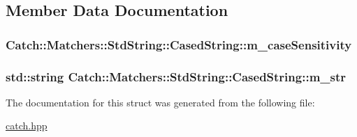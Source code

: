 \subsection{Member Data Documentation}
\hypertarget{struct_catch_1_1_matchers_1_1_std_string_1_1_cased_string_ae1c2864c986941536a6e94cca0528f92}{
\subsubsection[{m\-\_\-case\-Sensitivity}]{ Catch\-::\-Matchers\-::\-Std\-String\-::\-Cased\-String\-::m\-\_\-case\-Sensitivity}}\label{struct_catch_1_1_matchers_1_1_std_string_1_1_cased_string_ae1c2864c986941536a6e94cca0528f92}
\hypertarget{struct_catch_1_1_matchers_1_1_std_string_1_1_cased_string_ad05dbc99aba3c3c386d6b856b213f911}{
\subsubsection[{m\-\_\-str}]{\setlength{\rightskip}{0pt plus 5cm}std\-::string Catch\-::\-Matchers\-::\-Std\-String\-::\-Cased\-String\-::m\-\_\-str}}\label{struct_catch_1_1_matchers_1_1_std_string_1_1_cased_string_ad05dbc99aba3c3c386d6b856b213f911}


The documentation for this struct was generated from the following file\-:\begin{DoxyCompactItemize}
\item 
\hyperlink{catch_8hpp}{catch.\-hpp}\end{DoxyCompactItemize}
